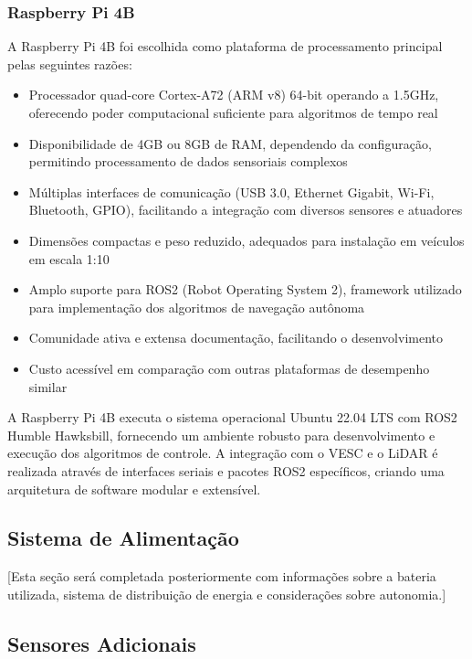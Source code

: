 \subsubsection{Raspberry Pi 4B}

A Raspberry Pi 4B foi escolhida como plataforma de processamento principal
pelas seguintes razões:

\begin{itemize}
    \item Processador quad-core Cortex-A72 (ARM v8) 64-bit operando a 1.5GHz, oferecendo
          poder computacional suficiente para algoritmos de tempo real
    \item Disponibilidade de 4GB ou 8GB de RAM, dependendo da configuração, permitindo
          processamento de dados sensoriais complexos
    \item Múltiplas interfaces de comunicação (USB 3.0, Ethernet Gigabit, Wi-Fi,
          Bluetooth, GPIO), facilitando a integração com diversos sensores e atuadores
    \item Dimensões compactas e peso reduzido, adequados para instalação em veículos em
          escala 1:10
    \item Amplo suporte para ROS2 (Robot Operating System 2), framework utilizado para
          implementação dos algoritmos de navegação autônoma
    \item Comunidade ativa e extensa documentação, facilitando o desenvolvimento
    \item Custo acessível em comparação com outras plataformas de desempenho similar
\end{itemize}

A Raspberry Pi 4B executa o sistema operacional Ubuntu 22.04 LTS com ROS2
Humble Hawksbill, fornecendo um ambiente robusto para desenvolvimento e
execução dos algoritmos de controle. A integração com o VESC e o LiDAR é
realizada através de interfaces seriais e pacotes ROS2 específicos, criando uma
arquitetura de software modular e extensível.

\subsection{Sistema de Alimentação}

[Esta seção será completada posteriormente com informações sobre a bateria utilizada, sistema de distribuição de energia e considerações sobre autonomia.]

\subsection{Sensores Adicionais}

